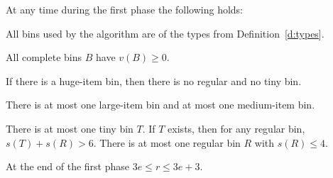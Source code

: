 \begin{lem}
\label{l:1} 
At any time during the first phase the following holds:
\begin{compactenum}[\rm(i)]
\item 
\label{i1:classify} 
All bins used by the algorithm are of the types from Definition~\ref{d:types}.
\item 
\label{i1:complete} 
All complete bins $B$ have $v(B)\geq0$.
\item 
\label{i1:hr} 
If there is a huge-item bin, then there is no regular and no tiny bin.
\item 
\label{i1:lm} 
There is at most one large-item bin and at most one medium-item bin.
\item 
\label{i1:tiny} 
There is at most one tiny bin $T$. If $T$ exists, then for any regular
bin, $s(T)+s(R)>6$. There is at most one regular bin $R$ with
$s(R)\leq 4$.
\item 
\label{i1:er} 
At the end of the first phase $3e\leq r \leq 3e+3$.
\end{compactenum}
\end{lem}
